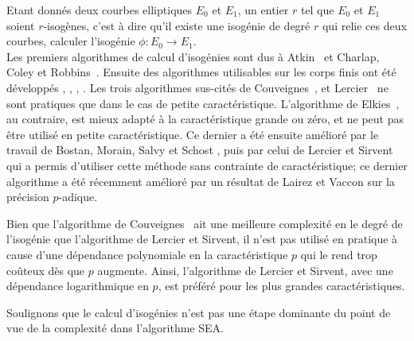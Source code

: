 \documentclass[10pt,a4paper]{book}
\theoremstyle{plain}
\theoremstyle{definition}
\theoremstyle{definition}
\theoremstyle{definition}
\theoremstyle{definition}
\theoremstyle{definition}
\theoremstyle{remark}
\theoremstyle{remark}
\theoremstyle{definition}
\begin{document}

Etant donnés deux courbes elliptiques $E_0$ et $E_1$, un entier $r$ tel que 
$E_0$ et $E_1$ soient $r$-isogènes, c'est à dire qu'il existe une isogénie de 
degré $r$  qui relie ces deux courbes, calculer l'isogénie $\phi:E_0 \rightarrow E_1$.
\\

Les premiers algorithmes de calcul d'isogénies sont dus à Atkin~\cite{Atkin91}
et Charlap, Coley et Robbins~\cite{CharlapColeyRobbins91}. Ensuite des 
algorithmes utilisables sur les corps finis ont été développés 
\cite{Elkies1998}, \cite{Couveignes94}, \cite{Couveignes96}, \cite{Lercier96}.
Les trois algorithmes sus-cités de Couveignes~\cite{Couveignes94}, 
\cite{Couveignes96} et Lercier~\cite{Lercier96} ne sont pratiques que dans le
cas de petite caractéristique. L'algorithme de Elkies~\cite{Elkies1998}, au 
contraire, est mieux adapté à la caractéristique grande ou zéro, et ne peut pas 
être utilisé en petite caractéristique. Ce dernier a
été ensuite amélioré par le travail de Bostan, Morain, Salvy et Schost 
\cite{BMSS08}, puis par celui de Lercier et Sirvent~\cite{Lercier-Sirvent2008} 
qui a permis d'utiliser cette méthode sans contrainte de caractéristique; ce 
dernier algorithme a été récemment amélioré par un résultat de Lairez et Vaccon 
\cite{LairezVaccon16} sur la précision $p$-adique. 

Bien que l'algorithme de Couveignes~\cite{Couveignes96} ait une meilleure 
complexité en le degré de l'isogénie que l'algorithme de Lercier et 
Sirvent, %
il n'est pas utilisé en pratique à 
cause d'une dépendance polynomiale en la caractéristique $p$ qui le rend trop 
coûteux dès que $p$ augmente. Ainsi, l'algorithme de Lercier et 
Sirvent, %
 avec une dépendance logarithmique en $p$, 
est préféré pour les plus grandes caractéristiques. 

Soulignons que le calcul d'isogénies n'est pas une étape dominante du point de
vue de la complexité dans l'algorithme SEA.
\end{document}
